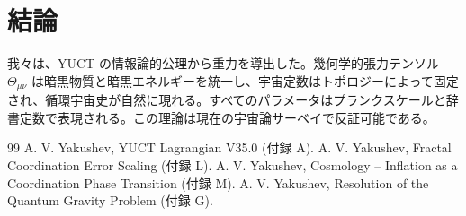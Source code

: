 \documentclass[12pt,a4paper]{article}
\begin{document}
	\section{結論}
	我々は、YUCT の情報論的公理から重力を導出した。幾何学的張力テンソル \(\Theta_{\mu\nu}\) は暗黒物質と暗黒エネルギーを統一し、宇宙定数はトポロジーによって固定され、循環宇宙史が自然に現れる。すべてのパラメータはプランクスケールと辞書定数で表現される。この理論は現在の宇宙論サーベイで反証可能である。
	
	\begin{thebibliography}{99}
		 A. V. Yakushev, YUCT Lagrangian V35.0 (付録 A).
		 A. V. Yakushev, Fractal Coordination Error Scaling (付録 L).
		 A. V. Yakushev, Cosmology -- Inflation as a Coordination Phase Transition (付録 M).
		 A. V. Yakushev, Resolution of the Quantum Gravity Problem (付録 G).
	\end{thebibliography}
	
\end{document}
